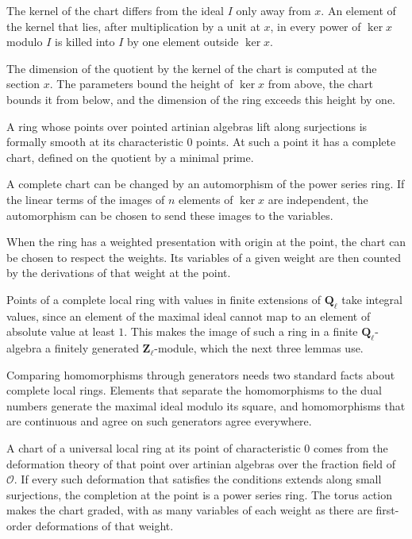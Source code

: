 The kernel of the chart differs from the ideal $I$ only away from $x$. An element of the kernel that lies, after multiplication by a unit at $x$, in every power of $\ker x$ modulo $I$ is killed into $I$ by one element outside $\ker x$.

The dimension of the quotient by the kernel of the chart is computed at the section $x$. The parameters bound the height of $\ker x$ from above, the chart bounds it from below, and the dimension of the ring exceeds this height by one.

A ring whose points over pointed artinian algebras lift along surjections is formally smooth at its characteristic $0$ points. At such a point it has a complete chart, defined on the quotient by a minimal prime.

A complete chart can be changed by an automorphism of the power series ring. If the linear terms of the images of $n$ elements of $\ker x$ are independent, the automorphism can be chosen to send these images to the variables.

When the ring has a weighted presentation with origin at the point, the chart can be chosen to respect the weights. Its variables of a given weight are then counted by the derivations of that weight at the point.

Points of a complete local ring with values in finite extensions of $\mathbf Q_\ell$ take integral values, since an element of the maximal ideal cannot map to an element of absolute value at least $1$. This makes the image of such a ring in a finite $\mathbf Q_\ell$-algebra a finitely generated $\mathbf Z_\ell$-module, which the next three lemmas use.

Comparing homomorphisms through generators needs two standard facts about complete local rings. Elements that separate the homomorphisms to the dual numbers generate the maximal ideal modulo its square, and homomorphisms that are continuous and agree on such generators agree everywhere.

A chart of a universal local ring at its point of characteristic $0$ comes from the deformation theory of that point over artinian algebras over the fraction field of $\mathcal O$. If every such deformation that satisfies the conditions extends along small surjections, the completion at the point is a power series ring. The torus action makes the chart graded, with as many variables of each weight as there are first-order deformations of that weight.

